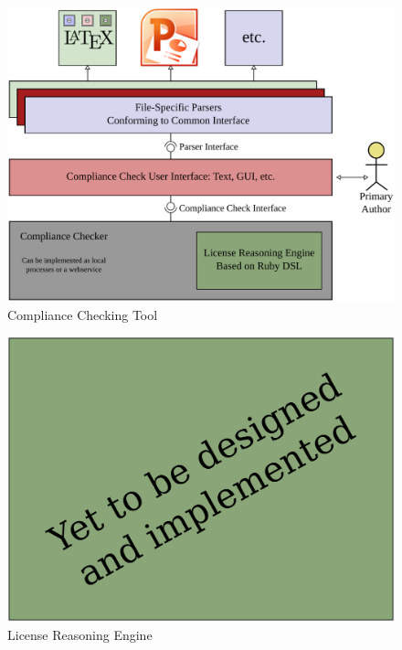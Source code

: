 \documentclass[botnum,fleqn,final]{unmeethesis}
\begin{document}
\begin{figure}[!htpb]
    \begin{center}
            \includegraphics[width=1.0\textwidth]{compliance-checking-tool.pdf}
    \end{center}
    \caption[Compliance Checking Tool]{Compliance Checking Tool}
    \label{fi:complianceCheckingTool}
\end{figure}

\begin{figure}[!htpb]
    \begin{center}
            \includegraphics[width=1.0\textwidth]{todo.pdf}
    \end{center}
    \caption[License Reasoning Engine]{License Reasoning Engine}
    \label{fi:licenseReasoningEngine}
\end{figure}
\end{document}
